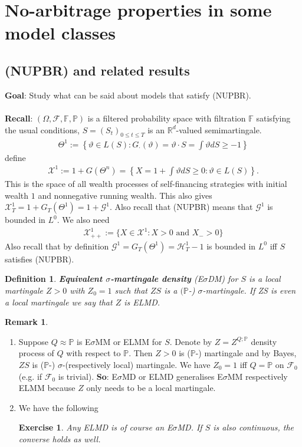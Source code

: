 \documentclass[12pt,a4paper, twoside]{article}
\newtheorem{defn}{Definition}[section]
\newtheorem{exe}{Exercise}[section]
\theoremstyle{definition}
\newtheorem{rem}{Remark}[section]
\newcommand{\PP}{\mathbb{P}} %
\begin{document}
\section{No-arbitrage properties in some model classes}
\subsection{(NUPBR) and related results}
\textbf{Goal}: Study what can be said about models that satisfy (NUPBR).
\\\\
\textbf{Recall}: $( \Omega, \mathcal{F}, \mathbb{F}, \PP)$ is a filtered probability space with filtration $\mathbb{F}$ satisfying the usual conditions, $S=(S_t)_{0 \leq t \leq T}$ is an $\mathbb{R}^d$-valued semimartingale. 
\begin{align*}
\Theta^1:= \left\{ \vartheta \in L(S): G_\cdot ( \vartheta) = \vartheta \cdot S = \int \vartheta dS \geq -1 \right\}
\end{align*}
define
\begin{align*}
\mathcal{X}^1 := 1 + G( \Theta^n) = \left\{ X = 1 + \int \vartheta dS \geq 0 : \vartheta \in L(S) \right\}. 
\end{align*}
This is the space of all wealth processes of self-financing strategies with initial wealth $1$ and nonnegative running wealth. This also gives $\mathcal{X}_T^1 = 1 + G_T( \Theta^1) = 1 + \mathcal{G}^1$. Also recall that (NUPBR) means that $\mathcal{G}^1$ is bounded in $L^0$. We also need 
\begin{align*}
\mathcal{X}_{++}^1:= \{ X \in \mathcal{X}^1 : X >0 \text{ and } X_- >0 \}
\end{align*}
Also recall that by definition $\mathcal{G}^1= G_T( \Theta^1) = \mathcal{H}_T^1-1$ is bounded in $L^0$ iff $S$ satisfies (NUPBR). 
\begin{defn} \textbf{Equivalent $\sigma$-martingale density} (E$\sigma$DM) for $S$ is a local martingale $Z >0$ with $Z_0 = 1$ such that $ZS$ is a $(\PP$-) $\sigma$-martingale. If ZS is even a local martingale we say that $Z$ is ELMD. 
\end{defn}
\begin{rem} \
\begin{enumerate}
\item Suppose $Q \approx \PP$ is E$\sigma$MM or ELMM for $S$. Denote by $Z = Z^{Q; \PP}$ density process of $Q$ with respect to $\PP$. Then $Z >0$ is ($\PP$-) martingale and by Bayes, $ZS$ is ($\PP$-) $\sigma$-(respectively local) martingale. We have $Z_0=1$ iff $Q= \PP$ on $\mathcal{F}_0$ (e.g. if $\mathcal{F}_0$ is trivial). 
\textbf{So}: E$\sigma$MD or ELMD generalises E$\sigma$MM respectively ELMM because $Z$ only needs to be a local martingale. 
\item We have the following
\begin{exe} \label{ex17} Any ELMD is of course an E$\sigma$MD. If $S$ is also continuous, the converse holds as well. 
\end{exe}
\end{enumerate}
\end{rem}
\end{document}
